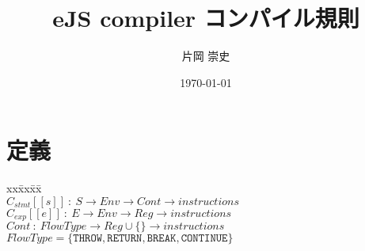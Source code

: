 \documentclass[a4j,12pt]{jarticle}
\title{eJS compiler コンパイル規則}
\author{片岡 崇史}
\date{\today}
\begin{document}
\maketitle

\section{定義}
\footnotesize{
\begin{tabbing}
xx\=xx\=xx\=\kill \\
  $C_{stmt}[[s]]\ :\ S \rightarrow Env \rightarrow Cont \rightarrow instructions$ \\
  $C_{exp}[[e]]\ :\ E \rightarrow Env \rightarrow Reg \rightarrow instructions$ \\
  $Cont\ :\ FlowType \rightarrow Reg \cup \{\} \rightarrow instructions $ \\
  $FlowType = \{ \texttt{THROW},\texttt{RETURN},\texttt{BREAK},\texttt{CONTINUE}\}$ \\
\end{tabbing}
}
\end{document}
